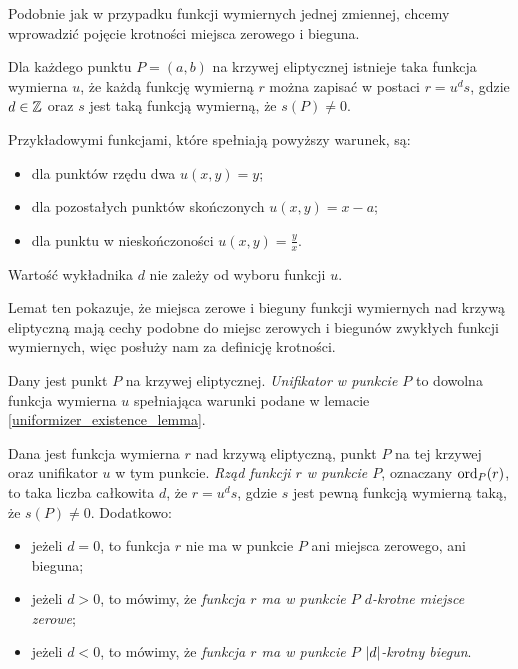 Podobnie jak w przypadku funkcji wymiernych jednej zmiennej,
chcemy wprowadzić pojęcie krotności miejsca zerowego i bieguna.

\begin{lemma}\label{uniformizer_existence_lemma}
Dla każdego punktu $P = (a, b)$ na krzywej eliptycznej
istnieje taka funkcja wymierna $u$,
że każdą funkcję wymierną $r$ można zapisać w postaci $r = u^ds$,
gdzie $d \in \mathbb{Z}$ oraz $s$ jest taką funkcją wymierną, że $s(P) \neq 0$.

Przykładowymi funkcjami, które spełniają powyższy warunek, są:
\begin{itemize}
\item dla punktów rzędu dwa $u(x, y) = y$;
\item dla pozostałych punktów skończonych $u(x, y) = x - a$;
\item dla punktu w nieskończoności $u(x, y) = \frac{y}{x}$.
\end{itemize}

Wartość wykładnika $d$ nie zależy od wyboru funkcji $u$.
\end{lemma}

Lemat ten pokazuje,
że miejsca zerowe i bieguny funkcji wymiernych nad krzywą eliptyczną
mają cechy podobne
do miejsc zerowych i biegunów zwykłych funkcji wymiernych,
więc posłuży nam za definicję krotności.

\begin{definition}
Dany jest punkt $P$ na krzywej eliptycznej.
\emph{Unifikator w punkcie $P$}
to dowolna funkcja wymierna $u$
spełniająca warunki podane w lemacie \ref{uniformizer_existence_lemma}.
\end{definition}

\begin{definition}
Dana jest funkcja wymierna $r$ nad krzywą eliptyczną,
punkt $P$ na tej krzywej oraz unifikator $u$ w tym punkcie.
\emph{Rząd funkcji $r$ w punkcie $P$},
oznaczany $\operatorname{ord}_P(r)$,
to taka liczba całkowita $d$,
że $r = u^ds$,
gdzie $s$ jest pewną funkcją wymierną taką, że $s(P) \neq 0$.
Dodatkowo:
\begin{itemize}
\item jeżeli $d = 0$,
to funkcja $r$ nie ma w punkcie $P$ ani miejsca zerowego, ani bieguna;
\item jeżeli $d > 0$, to mówimy,
że \emph{funkcja $r$ ma w punkcie $P$ $d$-krotne miejsce zerowe};
\item jeżeli $d < 0$, to mówimy,
że \emph{funkcja $r$ ma w punkcie $P$ $\lvert d\rvert$-krotny biegun}.
\end{itemize}
\end{definition}
